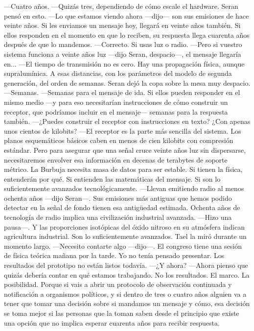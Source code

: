\documentclass[11pt,a5paper,twoside]{book}
\begin{document}
—Cuatro años.
—Quizás tres, dependiendo de cómo escale el hardware.
Seran pensó en esto.
—Lo que estamos viendo ahora —dijo— son sus emisiones de hace veinte años. Si les enviamos un mensaje hoy, llegará en veinte años también. Si ellos responden en el momento en que lo reciben, su respuesta llega cuarenta años después de que lo mandemos.
—Correcto. Si usas luz o radio.
—Pero si vuestro sistema funciona a veinte años luz —dijo Seran, despacio—, el mensaje llegaría en...
—El tiempo de transmisión no es cero. Hay una propagación física, aunque supralumínica. A esas distancias, con los parámetros del modelo de segunda generación, del orden de semanas.
Seran dejó la copa sobre la mesa muy despacio.
—Semanas.
—Semanas para el mensaje de ida. Si ellos pueden responder en el mismo medio —y para eso necesitarían instrucciones de cómo construir un receptor, que podríamos incluir en el mensaje— semanas para la respuesta también.
—¿Puedes construir el receptor con instrucciones en texto? ¿Con apenas unos cientos de kilobits?
—El receptor es la parte más sencilla del sistema. Los planos esquemáticos básicos caben en menos de cien kilobits con compresión estándar. Pero para asegurar que una señal cruce veinte años luz sin dispersarse, necesitaremos envolver esa información en decenas de terabytes de soporte métrico. La Burbuja necesita masa de datos para ser estable. Si tienen la física, entenderán por qué. Si entienden las matemáticas del mensaje. Si son lo suficientemente avanzados tecnológicamente.
—Llevan emitiendo radio al menos ochenta años —dijo Seran—. Sus emisiones más antiguas que hemos podido detectar en la señal de fondo tienen esa antigüedad estimada. Ochenta años de tecnología de radio implica una civilización industrial avanzada. —Hizo una pausa—. Y las proporciones isotópicas del óxido nitroso en su atmósfera indican agricultura industrial. Son lo suficientemente avanzados.
Tael la miró durante un momento largo.
—Necesito contarte algo —dijo—. El congreso tiene una sesión de física teórica mañana por la tarde. Yo no tenía pensado presentar. Los resultados del prototipo no están listos todavía.
—¿Y ahora?
—Ahora pienso que quizás debería contar en qué estamos trabajando. No los resultados. El marco. La posibilidad. Porque si vais a abrir un protocolo de observación continuada y notificación a organismos políticos, y si dentro de tres o cuatro años alguien va a tener que tomar una decisión sobre si mandamos un mensaje y cómo, esa decisión se toma mejor si las personas que la toman saben desde el principio que existe una opción que no implica esperar cuarenta años para recibir respuesta.
\end{document}

